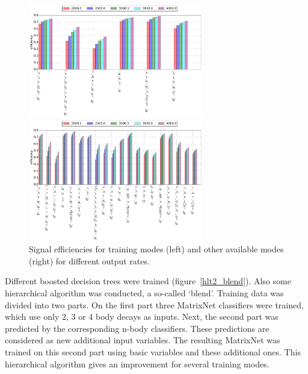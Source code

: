 \documentclass[a4paper]{jpconf}
\begin{document}
\begin{figure}[h]
\begin{minipage}{18pc}
\includegraphics[width=18pc]{../images/rates_small.pdf}
\end{minipage}\hspace{2pc}%
\begin{minipage}{18pc}
\includegraphics[width=18pc]{../images/rates.pdf}
\end{minipage} 
\caption{\label{hlt2_out} Signal efficiencies for training modes (left) and other available modes (right) for different output rates.}
\end{figure}

Different boosted decision trees were trained (figure~\ref{hlt2_blend}). Also some hierarchical algorithm was conducted, a so-called `blend'. Training data was divided into two parts. On the first part three MatrixNet classifiers were trained, which use only 2, 3 or 4 body decays as inputs. Next, the second part was predicted by the corresponding n-body classifiers. These predictions are considered as new additional input variables. The resulting MatrixNet was trained on this second part using basic variables and these additional ones. This hierarchical algorithm gives an improvement for several training modes.
\end{document}
